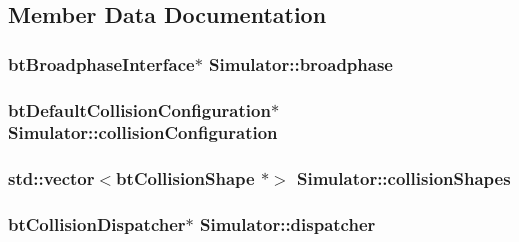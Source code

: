 \subsection{Member Data Documentation}
\hypertarget{classSimulator_abf328154008d231ebff7a42a58791e5b}{
\subsubsection[{broadphase}]{\setlength{\rightskip}{0pt plus 5cm}bt\-Broadphase\-Interface$\ast$ Simulator\-::broadphase\hspace{0.3cm}{\ttfamily [private]}}}\label{classSimulator_abf328154008d231ebff7a42a58791e5b}
\hypertarget{classSimulator_ae128785e92d1f8cac37b7008ff6c0cf7}{
\subsubsection[{collision\-Configuration}]{\setlength{\rightskip}{0pt plus 5cm}bt\-Default\-Collision\-Configuration$\ast$ Simulator\-::collision\-Configuration\hspace{0.3cm}{\ttfamily [private]}}}\label{classSimulator_ae128785e92d1f8cac37b7008ff6c0cf7}
\hypertarget{classSimulator_a76a5f71d55dd786819ab1240e5a45791}{
\subsubsection[{collision\-Shapes}]{\setlength{\rightskip}{0pt plus 5cm}std\-::vector$<$bt\-Collision\-Shape $\ast$$>$ Simulator\-::collision\-Shapes\hspace{0.3cm}{\ttfamily [private]}}}\label{classSimulator_a76a5f71d55dd786819ab1240e5a45791}
\hypertarget{classSimulator_af84d7e00b1ee5bcade4e40847eea3fd4}{
\subsubsection[{dispatcher}]{\setlength{\rightskip}{0pt plus 5cm}bt\-Collision\-Dispatcher$\ast$ Simulator\-::dispatcher\hspace{0.3cm}{\ttfamily [private]}}}\label{classSimulator_af84d7e00b1ee5bcade4e40847eea3fd4}
